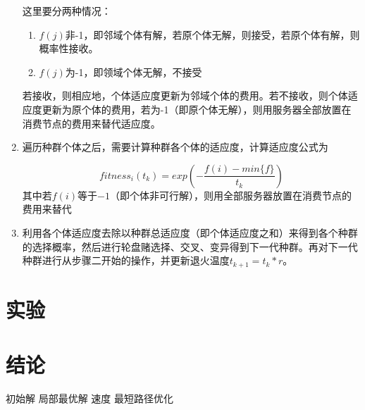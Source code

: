 \documentclass[a4paper,11pt,onecolumn,twoside]{article}
\begin{document}
\begin{multicols}{2}
\begin{enumerate}
这里要分两种情况：
\begin{enumerate}
	\item $f(j)$非-1，即邻域个体有解，若原个体无解，则接受，若原个体有解，则概率性接收。
	\item $f(j)$为-1，即领域个体无解，不接受
\end{enumerate}

若接收，则相应地，个体适应度更新为邻域个体的费用。若不接收，则个体适应度更新为原个体的费用，若为-1（即原个体无解），则用服务器全部放置在消费节点的费用来替代适应度。

\item 遍历种群个体之后，需要计算种群各个体的适应度，计算适应度公式为

$$fitness_i(t_k) = exp(-\frac{f(i)-min\{f\}}{t_k})$$
其中若$f(i)$等于$-1$（即个体非可行解），则用全部服务器放置在消费节点的费用来替代

\item 利用各个体适应度去除以种群总适应度（即个体适应度之和）来得到各个种群的选择概率，然后进行轮盘赌选择、交叉、变异得到下一代种群。再对下一代种群进行从步骤二开始的操作，并更新退火温度$t_{k+1} = t_k * r$。

\end{enumerate}

\section{实验}

\section{结论}
初始解
局部最优解
速度
最短路径优化





\end{multicols}

\clearpage
\end{document}
